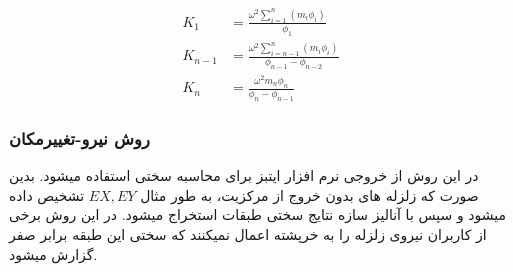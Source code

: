 \begin{equation} \label{eq:modal_stiffness}
    \begin{split}
        K_1 & = \frac{\omega^2 \sum_{i=1}^{n}(m_i \phi_i)}{\phi_1} \\
        K_{n-1} & = \frac{\omega^2 \sum_{i=n-1}^{n}(m_i \phi_i)}{\phi_{n-1} - \phi_{n-2}} \\
        K_n & = \frac{\omega^2 m_n \phi_n}{\phi_n - \phi_{n-1}}
    \end{split}
\end{equation}

\subsubsection{روش نیرو-تغییرمکان}
در این روش از خروجی نرم افزار ایتبز برای محاسبه سختی استفاده میشود. بدین صورت که زلزله های بدون خروج از مرکزیت، به طور مثال 
$EX, EY$
 تشخیص داده میشود و سپس با آنالیز سازه نتایج سختی طبقات استخراج میشود.
در این روش برخی از کاربران نیروی زلزله را به خرپشته اعمال نمیکنند که سختی این طبقه برابر صفر گزارش میشود.

